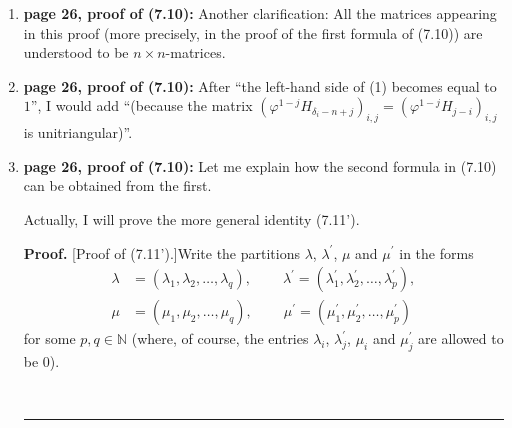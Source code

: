 \documentclass[numbers=enddot,12pt,final,onecolumn,notitlepage]{scrartcl}%
\theoremstyle{definition}
\newenvironment{proof}[1][Proof]{\noindent\textbf{#1.} }{\ \rule{0.5em}{0.5em}}
\begin{document}
\begin{enumerate}
\begin{itemize}
\item The expression \textquotedblleft$\det\left(  \varphi^{j-1}E_{\lambda
_{i}^{\prime}-i+j}\left(  V\right)  \right)  $\textquotedblright\ is
understood to mean the determinant%
\[
\det\left(  \varphi^{j-1}E_{\lambda_{i}^{\prime}-i+j}\left(  V\right)
\right)  _{i,j\in\left[  p\right]  },
\]
where $p$ is any integer such that $\ell\left(  \lambda^{\prime}\right)  \leq
p$. (Again, this determinant does not depend on the choice of $p$, for a
reason similar to the one we just gave.)
\end{itemize}

\item \textbf{page 26, proof of (7.10):} Another clarification: All the
matrices appearing in this proof (more precisely, in the proof of the first
formula of (7.10)) are understood to be $n\times n$-matrices.

\item \textbf{page 26, proof of (7.10):} After \textquotedblleft the left-hand
side of (1) becomes equal to $1$\textquotedblright, I would add
\textquotedblleft(because the matrix $\left(  \varphi^{1-j}H_{\delta_{i}%
-n+j}\right)  _{i,j}=\left(  \varphi^{1-j}H_{j-i}\right)  _{i,j}$ is
unitriangular)\textquotedblright.

\item \textbf{page 26, proof of (7.10):} Let me explain how the second formula
in (7.10) can be obtained from the first.

Actually, I will prove the more general identity (7.11').

\begin{proof}
[Proof of (7.11').]Write the partitions $\lambda$, $\lambda^{\prime}$, $\mu$
and $\mu^{\prime}$ in the forms%
\begin{align*}
\lambda &  =\left(  \lambda_{1},\lambda_{2},\ldots,\lambda_{q}\right)
,\ \ \ \ \ \ \ \ \ \ \lambda^{\prime}=\left(  \lambda_{1}^{\prime},\lambda
_{2}^{\prime},\ldots,\lambda_{p}^{\prime}\right)  ,\\
\mu &  =\left(  \mu_{1},\mu_{2},\ldots,\mu_{q}\right)
,\ \ \ \ \ \ \ \ \ \ \mu^{\prime}=\left(  \mu_{1}^{\prime},\mu_{2}^{\prime
},\ldots,\mu_{p}^{\prime}\right)
\end{align*}
for some $p,q\in\mathbb{N}$ (where, of course, the entries $\lambda_{i}$,
$\lambda_{j}^{\prime}$, $\mu_{i}$ and $\mu_{j}^{\prime}$ are allowed to be $0$).


\end{proof}
\end{enumerate}
\end{document}

